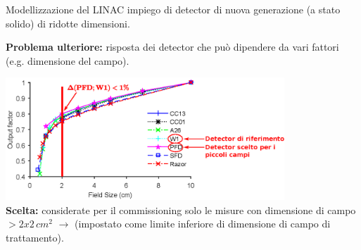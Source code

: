 \documentclass{beamer}
\begin{document}
\begin{frame}[t]{Modellizzazione del LINAC}
\footnotesize
{} impiego di detector di nuova generazione (a stato solido) di ridotte dimensioni.\\ \vspace{.5cm}

\alert{\bf Problema ulteriore:} risposta dei detector che può dipendere da vari fattori (e.g. dimensione del campo).\\ \vspace{.3cm}

\includegraphics[height=4.6cm]{./img/OF_MOD.eps}\\\vspace{.2cm}
{\scriptsize \color{Dgreen} \textbf{Scelta:} considerate per il commissioning solo le misure con dimensione di campo $> 2x2\,cm^2$ $\rightarrow$ (impostato come limite inferiore di dimensione di campo di trattamento).}

\end{frame}
\end{document}
